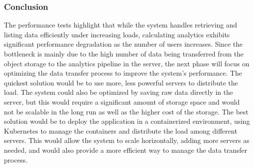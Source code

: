 \subsubsection{Conclusion}
The performance tests highlight that while the system handles retrieving and listing data efficiently under increasing loads, calculating analytics exhibits significant performance degradation as the number of users increases. Since the bottleneck is mainly due to the high number of data being transferred from the object storage to the analytics pipeline in the server, the next phase will focus on optimizing the data transfer process to improve the system's performance. The quickest solution would be to use more, less powerful servers to distribute the load. The system could also be optimized by saving raw data directly in the server, but this would require a significant amount of storage space and would not be scalable in the long run as well as the higher cost of the storage. The best solution would be to deploy the application in a containerized environment, using Kubernetes to manage the containers and distribute the load among different servers. This would allow the system to scale horizontally, adding more servers as needed, and would also provide a more efficient way to manage the data transfer process.
